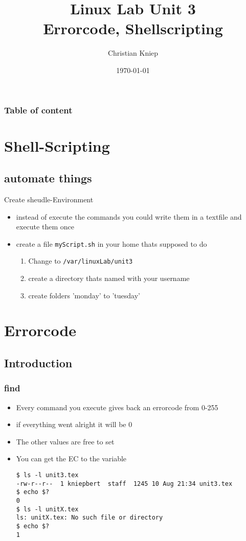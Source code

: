 \documentclass[handout]{beamer}
\author{Christian Kniep}
\newcommand{\code}[1]{\colorbox{lGray}{\texttt{#1}}}
\begin{document}
\title[Linux Lab Unit 2]{Linux Lab Unit 3 \\ Errorcode, Shellscripting}  
\date[\today]{\today} 

\begin{frame}
	\titlepage
\end{frame} 

\begin{frame}
	\frametitle{Table of content}
	\tableofcontents
\end{frame} 

\section{Shell-Scripting}
    \subsection{automate things}
    \begin{frame}{Create sheudle-Environment}
        \begin{itemize}
            \item<1-> instead of execute the commands you could write them in a textfile and execute them once
            \item<2-> create a file \code{myScript.sh} in your home thats supposed to do
            \begin{enumerate}
                \item<2-> Change to \code{/var/linuxLab/unit3}
                \item<3-> create a directory thats named with your username
                \item<4-> create folders 'monday' to 'tuesday'
            \end{enumerate}
        \end{itemize}
    \end{frame}
\section{Errorcode} 
	\subsection{Introduction}
		\begin{frame}[fragile]
			\frametitle{find}
			\begin{itemize}
				\item<1-> Every command you execute gives back an errorcode from 0-255
                \item<2-> if everything went alright it will be 0
                \item<3-> The other values are free to set
                \item<4-> You can get the EC to the variable 
                    \begin{verbatim}
$ ls -l unit3.tex 
-rw-r--r--  1 kniepbert  staff  1245 10 Aug 21:34 unit3.tex
$ echo $?
0
$ ls -l unitX.tex 
ls: unitX.tex: No such file or directory
$ echo $?
1
\end{verbatim}
            \end{itemize}
		\end{frame}
\end{document}
